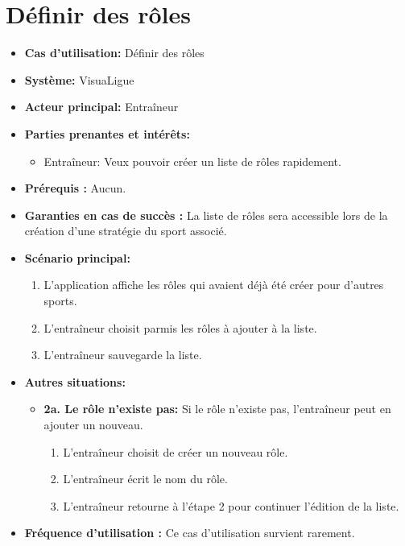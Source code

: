 \section{Définir des rôles}
\label{sec:definir_des_roles}

\begin{itemize}
    \item \textbf{Cas d'utilisation:} D\'efinir des r\^oles
    \item \textbf{Syst\`eme:} VisuaLigue
    \item \textbf{Acteur principal:} Entra\^ineur
    \item \textbf{Parties prenantes et int\'er\^ets:}
    	\begin{itemize}
    		\item Entraîneur: Veux pouvoir créer un liste de rôles rapidement.
    	\end{itemize}
    \item \textbf{Pr\'erequis :} Aucun.
    \item \textbf{Garanties en cas de succ\`es :} La liste de rôles sera accessible lors de la création d'une stratégie du sport associé.
    \item \textbf{Sc\'enario principal:}
        \begin{enumerate}
            \item L'application affiche les rôles qui avaient déjà été créer pour d'autres sports.
            \item L'entraîneur choisit parmis les rôles à ajouter à la liste.
            \item L'entraîneur sauvegarde la liste.
        \end{enumerate}
    \item \textbf{Autres situations:}
        \begin{itemize}
            \item \textbf{2a. Le rôle n'existe pas:} Si le rôle n'existe pas, l'entraîneur peut en ajouter un nouveau.
                \begin{enumerate}
                    \item L'entraîneur choisit de créer un nouveau rôle.
                    \item L'entraîneur écrit le nom du rôle.
                    \item L'entraîneur retourne à l'étape 2 pour continuer l'édition de la liste.
                \end{enumerate}
        \end{itemize}
	\item \textbf{Fréquence d'utilisation :} Ce cas d'utilisation survient rarement.
\end{itemize}



